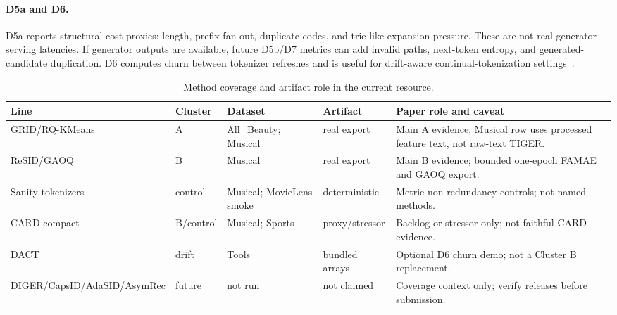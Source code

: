 \paragraph{D5a and D6.}
D5a reports structural cost proxies: \sid length, prefix fan-out, duplicate
codes, and trie-like expansion pressure. These are not real generator serving
latencies. If generator outputs are available, future D5b/D7 metrics can add
invalid paths, next-token entropy, and generated-candidate duplication. D6
computes churn between tokenizer refreshes and is useful for drift-aware
continual-tokenization settings~\cite{feng2026dact}.

\begin{table}[t]
\caption{Method coverage and artifact role in the current \tool resource.}
\label{tab:method-coverage}
\small
\begin{tabularx}{\textwidth}{@{}llllY@{}}
\toprule
Line & Cluster & Dataset & Artifact & Paper role and caveat \\
\midrule
GRID/RQ-KMeans & A & All\_Beauty; Musical & real export &
Main A evidence; Musical row uses processed feature text, not raw-text TIGER. \\
ReSID/GAOQ & B & Musical & real export &
Main B evidence; bounded one-epoch FAMAE and GAOQ export. \\
Sanity tokenizers & control & Musical; MovieLens smoke & deterministic &
Metric non-redundancy controls; not named methods. \\
CARD compact & B/control & Musical; Sports & proxy/stressor &
Backlog or stressor only; not faithful CARD evidence. \\
DACT & drift & Tools & bundled arrays &
Optional D6 churn demo; not a Cluster B replacement. \\
DIGER/CapsID/AdaSID/AsymRec & future & not run & not claimed &
Coverage context only; verify releases before submission. \\
\bottomrule
\end{tabularx}
\end{table}
